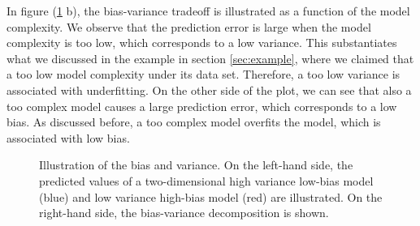 In figure (\ref{fig:bias_variance} b), the bias-variance tradeoff is illustrated as a function of the model complexity. We observe that the prediction error is large when the model complexity is too low, which corresponds to a low variance. This substantiates what we discussed in the example in section \ref{sec:example}, where we claimed that a too low model complexity under its data set. Therefore, a too low variance is associated with underfitting. On the other side of the plot, we can see that also a too complex model causes a large prediction error, which corresponds to a low bias. As discussed before, a too complex model overfits the model, which is associated with low bias. 

\begin{figure}
	\centering
	
	\caption{Illustration of the bias and variance. On the left-hand side, the predicted values of a two-dimensional high variance low-bias model (blue) and low variance high-bias model (red) are illustrated. On the right-hand side, the bias-variance decomposition is shown.}
	\label{fig:bias_variance}
\end{figure}


